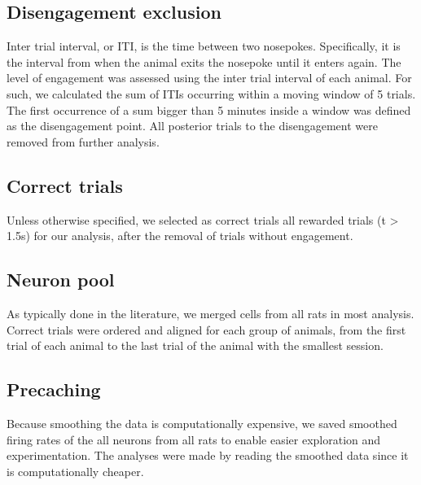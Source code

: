 \subsection{Disengagement exclusion}
    Inter trial interval, or ITI, is the time between two nosepokes. Specifically, it is the interval from when the animal exits the nosepoke until it enters again.
    The level of engagement was assessed using the inter trial interval of each animal. For such, we calculated the sum of ITIs occurring within a moving window of 5 trials. The first occurrence of a sum bigger than 5 minutes inside a window was defined as the disengagement point. All posterior trials to the disengagement were removed from further analysis.
    
\subsection{Correct trials}
    Unless otherwise specified, we selected as correct trials all rewarded trials (t > 1.5s) for our analysis, after the removal of trials without engagement. 
    
\subsection{Neuron pool}
    As typically done in the literature, we merged cells from all rats in most analysis. Correct trials were ordered and aligned for each group of animals, from the first trial of each animal to the last trial of the animal with the smallest session.
    
\subsection{Precaching}
    Because smoothing the data is computationally expensive, we saved smoothed firing rates of the all neurons from all rats to enable easier exploration and experimentation. The analyses were made by reading the smoothed data since it is computationally cheaper. 
    
